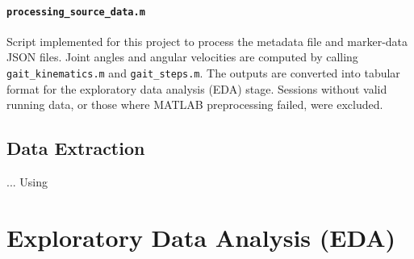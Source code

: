 {\paragraph{\texttt{processing\_source\_data.m}}  
Script implemented for this project to process the metadata file and marker-data JSON files. Joint angles and angular velocities are computed by calling \texttt{gait\_kinematics.m} and \texttt{gait\_steps.m}. The outputs are converted into tabular format for the exploratory data analysis (EDA) stage. Sessions without valid running data, or those where MATLAB preprocessing failed, were excluded.

\subsection{Data Extraction}\label{subsec:data-extraction}

... Using 








\section{Exploratory Data Analysis (EDA)}\label{sec:method-eda}




}

